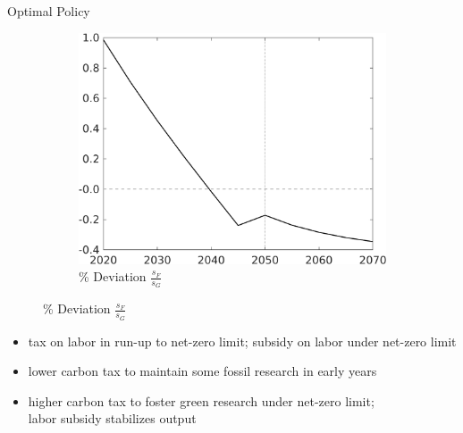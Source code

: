 \documentclass[11pt,aspectratio=169]{beamer}
\begin{document}
\begin{frame}{Optimal Policy}
\begin{figure}[h!!]
\begin{subfigure}{0.32\textwidth}
	\end{subfigure}
\begin{subfigure}{0.32\textwidth}
	\caption{\normalsize{\% Deviation $\frac{s_{F}}{s_G}$}}
	\includegraphics[width=1\textwidth]{../codding_model/own_basedOnFried/optimalPol_010922_revision/figures/all_13Sept22_Tplus30/sffsg_OPT_T_NoTaus_COMPtaulPer_regime4_spillover0_knspil0_noskill0_sep0_xgrowth0_PV1_etaa0.79.png}
\end{subfigure}
	\end{figure}
\begin{itemize}[<+-| alert@+>]
\item tax on labor in run-up to net-zero  limit; subsidy on labor under net-zero  limit
\item lower carbon tax to maintain some fossil research in early years
\item higher carbon tax to foster green research under net-zero limit;\\ labor subsidy stabilizes output %
\end{itemize}
\end{frame}
\end{document}
